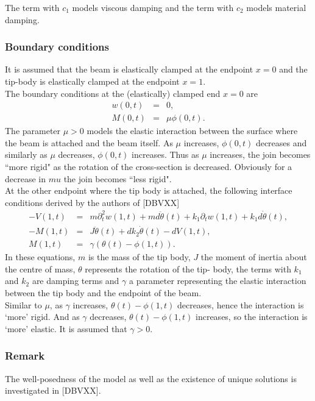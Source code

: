 \documentclass[../../main.tex]{subfiles}
\begin{document}
The term with $c_1$ models viscous damping and the term with $c_2$ models material damping.

\subsubsection{Boundary conditions}
It is assumed that the beam is elastically clamped at the endpoint $x=0$ and the tip-body is elastically clamped at the endpoint $x=1$.\\

The boundary conditions at the (elastically) clamped end $x=0$ are
\begin{eqnarray}
   w(0,t) &=&  0, \label{CT_5}\\
   M(0,t) &=&  \mu \phi(0,t). \label{CT_6}
\end{eqnarray}
The parameter $\mu > 0$ models the elastic interaction between the surface where the beam is attached and the beam itself. As $\mu$ increases, $\phi(0,t)$ decreases and similarly as $\mu$ decreases, $\phi(0,t)$ increases. Thus as $\mu$ increases, the join becomes ``more rigid" as the rotation of the cross-section is decreased. Obviously for a decrease in $mu$ the join becomes ``less rigid".\\

At the other endpoint where the tip body is attached, the following interface conditions derived by the authors of [DBVXX]
\begin{eqnarray}
- V(1,t) &=& m \partial_t^2 w(1,t) + md \ddot \theta(t) + k_1 \partial_t w(1,t) + k_1 d \dot \theta(t), \label{CT_7}\\
 -M(1,t) &=& J \ddot \theta(t) + d k_2 \dot \theta(t)- dV(1,t), \label{CT_8}\\
M(1,t) &=& \gamma (\theta(t)- \phi(1,t)). \label{CT_9}
\end{eqnarray}
In these equations, $m$ is the mass of the tip body, $J$ the moment of inertia about the centre of mass, $\theta$ represents the rotation of the tip- body, the terms with $k_1$ and $k_2$ are damping terms and $\gamma$ a parameter representing the elastic interaction between the tip body and the endpoint of the beam.\\

Similar to $\mu$, as $\gamma$ increases, $\theta(t) - \phi(1,t)$ decreases, hence the interaction is `more' rigid. And as $\gamma$ decreases, $\theta(t) - \phi(1,t)$ increases, so the interaction is `more' elastic. It is assumed that $\gamma > 0$.

\subsubsection{Remark}
The well-posedness of the model as well as the existence of unique solutions is investigated in [DBVXX].
\end{document}
